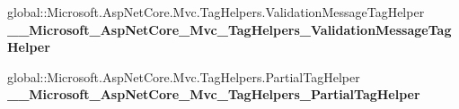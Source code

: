 \begin{DoxyCompactItemize}
\item 
\mbox{\label{class_projeto_e_s_w_1_1_areas_1_1_identity_1_1_pages_1_1_account_1_1_manage_1_1_areas___identity605f2cac3dc5a4ea38af9197eadd5652_a8ab66b020a56a9c885c5626305acc2f4}} 
global\+::\+Microsoft.\+Asp\+Net\+Core.\+Mvc.\+Tag\+Helpers.\+Validation\+Message\+Tag\+Helper {\bfseries \+\_\+\+\_\+\+Microsoft\+\_\+\+Asp\+Net\+Core\+\_\+\+Mvc\+\_\+\+Tag\+Helpers\+\_\+\+Validation\+Message\+Tag\+Helper}
\item 
\mbox{\label{class_projeto_e_s_w_1_1_areas_1_1_identity_1_1_pages_1_1_account_1_1_manage_1_1_areas___identity605f2cac3dc5a4ea38af9197eadd5652_ac641a7d8e843311c2a3a8cd1476aa1bc}} 
global\+::\+Microsoft.\+Asp\+Net\+Core.\+Mvc.\+Tag\+Helpers.\+Partial\+Tag\+Helper {\bfseries \+\_\+\+\_\+\+Microsoft\+\_\+\+Asp\+Net\+Core\+\_\+\+Mvc\+\_\+\+Tag\+Helpers\+\_\+\+Partial\+Tag\+Helper}
\end{DoxyCompactItemize}

